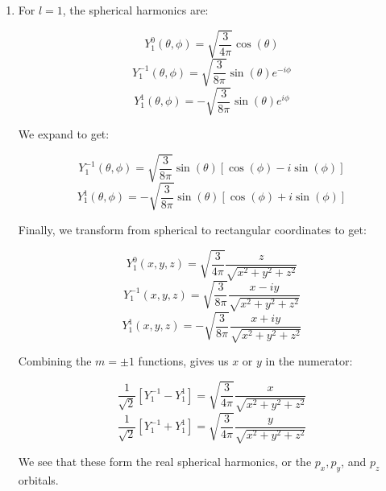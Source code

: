 \begin{enumerate}
\begin{enumerate}
    \end{enumerate}

  \item For $l=1$, the spherical harmonics are:

    $$Y^0_1(\theta,\phi)=\sqrt{\frac{3}{4\pi}}\cos(\theta)$$
    $$Y^{-1}_1(\theta,\phi)=\sqrt{\frac{3}{8\pi}}\sin(\theta)e^{-i\phi}$$
    $$Y^{1}_1(\theta,\phi)=-\sqrt{\frac{3}{8\pi}}\sin(\theta)e^{i\phi}$$

    We expand to get:

    $$Y^{-1}_1(\theta,\phi)=\sqrt{\frac{3}{8\pi}}\sin(\theta)[\cos(\phi)-i\sin(\phi)]$$
    $$Y^{1}_1(\theta,\phi)=-\sqrt{\frac{3}{8\pi}}\sin(\theta)[\cos(\phi)+i\sin(\phi)]$$

    Finally, we transform from spherical to rectangular coordinates to get:

    $$\boxed{Y^0_1(x,y,z)=\sqrt{\frac{3}{4\pi}}\frac{z}{\sqrt{x^2+y^2+z^2}}}$$
    $$\boxed{Y^{-1}_1(x,y,z)=\sqrt{\frac{3}{8\pi}}\frac{x-iy}{\sqrt{x^2+y^2+z^2}}}$$
    $$\boxed{Y^{1}_1(x,y,z)=-\sqrt{\frac{3}{8\pi}}\frac{x+iy}{\sqrt{x^2+y^2+z^2}}}$$

    Combining the $m=\pm1$ functions, gives us $x$ or $y$ in the numerator:

    $$\boxed{\frac{1}{\sqrt{2}}\left[ Y^{-1}_1-Y^{1}_1 \right]=\sqrt{\frac{3}{4\pi}}\frac{x}{\sqrt{x^2+y^2+z^2}}}$$
    $$\boxed{\frac{1}{\sqrt{2}}\left[ Y^{-1}_1+Y^{1}_1 \right]=\sqrt{\frac{3}{4\pi}}\frac{y}{\sqrt{x^2+y^2+z^2}}}$$

    We see that these form the real spherical harmonics, or the $p_x,p_y$, and $p_z$ orbitals.

\end{enumerate}



